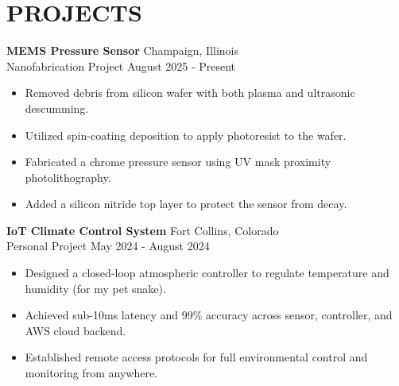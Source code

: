 \documentclass[a4paper,12pt]{extarticle}
\begin{document}
\section*{PROJECTS}


\textbf{MEMS Pressure Sensor}
\hfill Champaign, Illinois \\
Nanofabrication Project \hfill August 2025 - Present 
\begin{itemize}[topsep=0pt]
\itemindent=-13pt
\item
Removed debris from silicon wafer with both plasma and ultrasonic descumming.
\item
Utilized spin-coating deposition to apply photoresist to the wafer.
\item
Fabricated a chrome pressure sensor using UV mask proximity photolithography.
\item 
Added a silicon nitride top layer to protect the sensor from decay.
\end{itemize}

\vspace{\baselineskip}
\noindent
\textbf{IoT Climate Control System}
\hfill Fort Collins, Colorado
\\
Personal Project \hfill May 2024 - August 2024
\begin{itemize}[topsep=0pt]
\itemindent=-13pt
\item Designed a closed-loop atmospheric controller to regulate 
temperature and humidity (for my pet snake).
\item Achieved sub-10ms latency and 99\% accuracy across sensor, controller, and AWS cloud backend.
\item Established remote access protocols for full environmental control and monitoring from anywhere.
\end{itemize}
\end{document}
